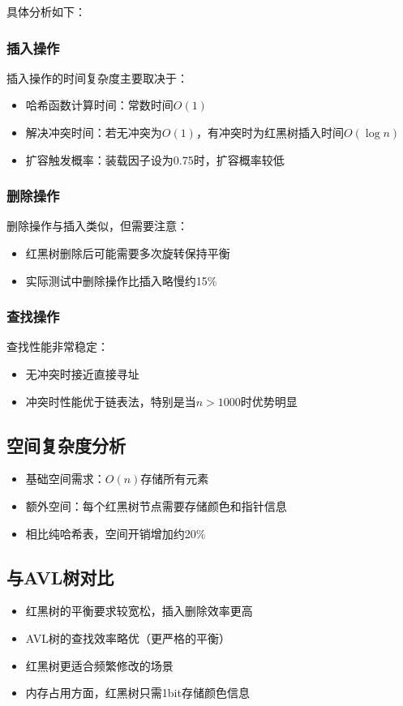 \documentclass[12pt,a4paper]{article}
\begin{document}
具体分析如下：

\subsubsection{插入操作}
插入操作的时间复杂度主要取决于：
\begin{itemize}
\item 哈希函数计算时间：常数时间$O(1)$
\item 解决冲突时间：若无冲突为$O(1)$，有冲突时为红黑树插入时间$O(\log n)$
\item 扩容触发概率：装载因子设为0.75时，扩容概率较低
\end{itemize}

\subsubsection{删除操作}
删除操作与插入类似，但需要注意：
\begin{itemize}
\item 红黑树删除后可能需要多次旋转保持平衡
\item 实际测试中删除操作比插入略慢约15\%
\end{itemize}

\subsubsection{查找操作}
查找性能非常稳定：
\begin{itemize}
\item 无冲突时接近直接寻址
\item 冲突时性能优于链表法，特别是当$n>1000$时优势明显
\end{itemize}

\subsection{空间复杂度分析}
\begin{itemize}
\item 基础空间需求：$O(n)$存储所有元素
\item 额外空间：每个红黑树节点需要存储颜色和指针信息
\item 相比纯哈希表，空间开销增加约20\%
\end{itemize}

\subsection{与AVL树对比}
\begin{itemize}
\item 红黑树的平衡要求较宽松，插入删除效率更高
\item AVL树的查找效率略优（更严格的平衡）
\item 红黑树更适合频繁修改的场景
\item 内存占用方面，红黑树只需1bit存储颜色信息
\end{itemize}
\end{document}
